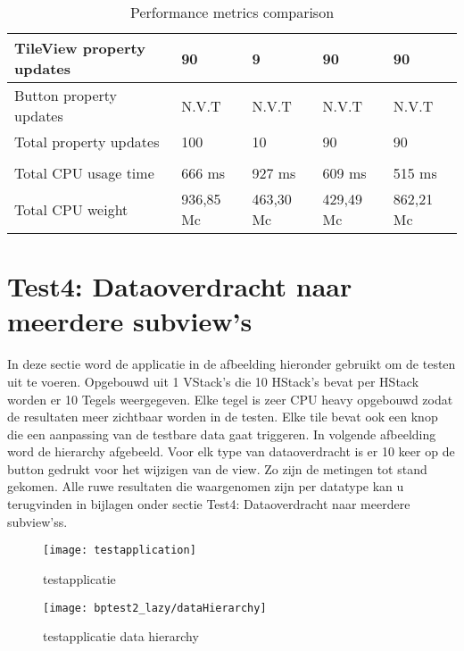 \begin{table}[H]
\begin{tabularx}{\textwidth}{|>{\raggedright\arraybackslash}m{5cm}|X|X|X|X|}
        \hline
        TileView property updates & 90 & 9 & 90 & 90 \\
        \hline
        Button property updates & N.V.T & N.V.T & N.V.T & N.V.T \\
        \hline
        Total property updates & 100 & 10 & 90 & 90 \\
        \hline
        \multicolumn{5}{|l|}{\textbf{CPU usage}} \\
        \hline
        Total CPU usage time & 666 ms & 927 ms & 609 ms & 515 ms \\
        \hline
        Total CPU weight & 936,85 Mc & 463,30 Mc & 429,49 Mc & 862,21 Mc \\
        \hline
    \end{tabularx}
    \caption{Performance metrics comparison}
    \label{tab:performance_metrics2}
\end{table}


\section{Test4: Dataoverdracht naar meerdere subview's}
In deze sectie word de applicatie in de afbeelding hieronder gebruikt om de testen uit te voeren. Opgebouwd uit 1 VStack's die 10 HStack's bevat per HStack worden er 10 Tegels weergegeven. Elke tegel is zeer CPU heavy opgebouwd zodat de resultaten meer zichtbaar worden in de testen. Elke tile bevat ook een knop die een aanpassing van de testbare data gaat triggeren. In volgende afbeelding word de hierarchy afgebeeld. Voor elk type van dataoverdracht is er 10 keer op de button gedrukt voor het wijzigen van de view. Zo zijn de metingen tot stand gekomen. Alle ruwe resultaten die waargenomen zijn per datatype kan u terugvinden in bijlagen onder sectie Test4: Dataoverdracht naar meerdere subview'ss.
\begin{figure}[H]
    \centering
    \texttt{[image: testapplication]} 
    \caption{testapplicatie}
    \label{fig:testapplication3}
\end{figure}
\begin{figure}[H]
    \centering
    \texttt{[image: bptest2\_lazy/dataHierarchy]} 
    \caption{testapplicatie data hierarchy}
    \label{fig:testapplicationHierarchy3}
\end{figure}


